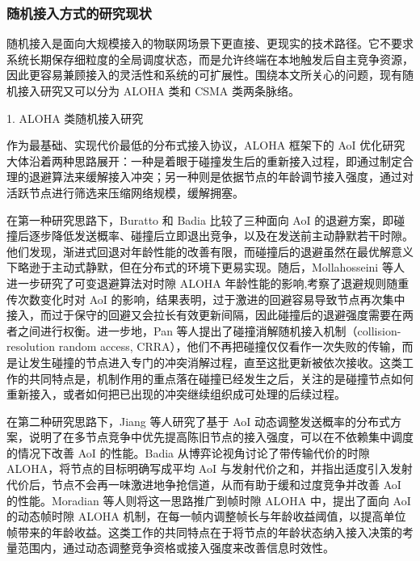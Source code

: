 \subsubsection{随机接入方式的研究现状}

随机接入是面向大规模接入的物联网场景下更直接、更现实的技术路径。它不要求系统长期保存细粒度的全局调度状态，而是允许终端在本地触发后自主竞争资源，因此更容易兼顾接入的灵活性和系统的可扩展性。围绕本文所关心的问题，现有随机接入研究又可以分为 ALOHA 类和 CSMA 类两条脉络。

1. ALOHA 类随机接入研究

作为最基础、实现代价最低的分布式接入协议，ALOHA 框架下的 AoI 优化研究大体沿着两种思路展开：一种是着眼于碰撞发生后的重新接入过程，即通过制定合理的退避算法来缓解接入冲突；另一种则是依据节点的年龄调节接入强度，通过对活跃节点进行筛选来压缩网络规模，缓解拥塞。

在第一种研究思路下，Buratto 和 Badia 比较了三种面向 AoI 的退避方案，即碰撞后逐步降低发送概率、碰撞后立即退出竞争，以及在发送前主动静默若干时隙。他们发现，渐进式回退对年龄性能的改善有限，而碰撞后的退避虽然在最优解意义下略逊于主动式静默，但在分布式的环境下更易实现。随后，Mollahosseini 等人进一步研究了可变退避算法对时隙 ALOHA 年龄性能的影响,考察了退避规则随重传次数变化时对 AoI 的影响，结果表明，过于激进的回避容易导致节点再次集中接入，而过于保守的回避又会拉长有效更新间隔，因此碰撞后的退避强度需要在两者之间进行权衡。进一步地，Pan 等人提出了碰撞消解随机接入机制（collision-resolution random access, CRRA），他们不再把碰撞仅仅看作一次失败的传输，而是让发生碰撞的节点进入专门的冲突消解过程，直至这批更新被依次接收。这类工作的共同特点是，机制作用的重点落在碰撞已经发生之后，关注的是碰撞节点如何重新接入，或者如何把已出现的冲突继续组织成可处理的后续过程。

在第二种研究思路下，Jiang 等人研究了基于 AoI 动态调整发送概率的分布式方案，说明了在多节点竞争中优先提高陈旧节点的接入强度，可以在不依赖集中调度的情况下改善 AoI 的性能。Badia 从博弈论视角讨论了带传输代价的时隙 ALOHA，将节点的目标明确写成平均 AoI 与发射代价之和，并指出适度引入发射代价后，节点不会再一味激进地争抢信道，从而有助于缓和过度竞争并改善 AoI 的性能。Moradian 等人则将这一思路推广到帧时隙 ALOHA 中，提出了面向 AoI 的动态帧时隙 ALOHA 机制，在每一帧内调整帧长与年龄收益阈值，以提高单位帧带来的年龄收益。这类工作的共同特点在于将节点的年龄状态纳入接入决策的考量范围内，通过动态调整竞争资格或接入强度来改善信息时效性。

